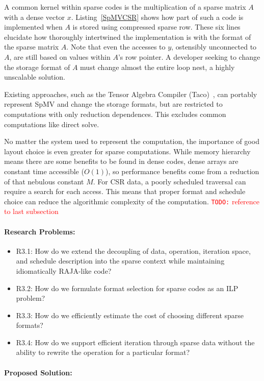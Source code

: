 \documentclass{article}
\newcommand{\todo}[1]{{\textcolor{red}{{\tt{TODO:}}\,\,#1 }}}
\begin{document}
A common kernel within sparse codes is the multiplication of a sparse matrix $A$ with a dense vector $x$.
Listing~\ref{SpMVCSR} shows how part of such a code is implemented when $A$ is stored using compressed sparse row.
These six lines elucidate how thoroughly intertwined the implementation is with the format of the sparse matrix $A$.
Note that even the accesses to $y$, ostensibly unconnected to $A$, are still based on values within $A$'s row pointer.
A developer seeking to change the storage format of $A$ must change almost the entire loop nest, a highly unscalable solution.

Existing approaches, such as the Tensor Algebra Compiler (Taco)~\cite{kjolstad2017tensor}, can portably represent SpMV and change the storage formats, but are restricted to computations with only reduction dependences.
This excludes common computations like direct solve.

No matter the system used to represent the computation, the importance of good layout choice is even greater for sparse computations.
While memory hierarchy means there are some benefits to be found in dense codes, dense arrays are constant time accessible ($O(1)$), so performance benefits come from a reduction of that nebulous constant $M$.
For CSR data, a poorly scheduled traversal can require a search for each access.
This means that proper format and schedule choice can reduce the algorithmic complexity of the computation.
\todo{reference to last subsection}


\paragraph{Research Problems:}
\begin{itemize}
    \item R3.1: How do we extend the decoupling of data, operation, iteration space, and schedule description into the sparse context while maintaining idiomatically RAJA-like code?
    \item R3.2: How do we formulate format selection for sparse codes as an ILP problem?
    \item R3.3: How do we efficiently estimate the cost of choosing different sparse formats?
    \item R3.4: How do we support efficient iteration through sparse data without the ability to rewrite the operation for a particular format? 
\end{itemize}


\paragraph{Proposed Solution:}
\end{document}
